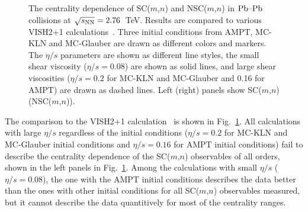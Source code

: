 \begin{figure}[t!]
	\begin{center}
        \caption{The centrality dependence of SC($m$,$n$) and NSC($m$,$n$) in $\textnormal{Pb--Pb}$ collisions at $\sqrt{s_{\textnormal{NN}}}=2.76$~TeV. Results are compared to various VISH2+1 calculations~\cite{Zhu:2016puf}. Three initial conditions from AMPT, MC-KLN and MC-Glauber are drawn as different colors and markers. The $\eta/s$ parameters are shown as different line styles, the small shear viscosity ($\eta/s=0.08$) are shown as solid lines, and large shear viscosities ($\eta/s=0.2$ for MC-KLN and MC-Glauber and 0.16 for AMPT) are drawn as dashed lines. Left (right) panels show SC($m$,$n$)  (NSC($m$,$n$)).}
        \label{fig:Figure_5}
        \end{center}   
 \end{figure}
 
The comparison to the VISH2+1 calculation~\cite{Zhu:2016puf} is shown in Fig.~\ref{fig:Figure_5}.  All calculations with large $\eta/s$ regardless of the initial conditions ($\eta/s=0.2$ for MC-KLN and MC-Glauber initial conditions and $\eta/s=0.16$ for AMPT initial conditions) fail to describe the centrality dependence of the SC($m$,$n$) observables of all orders, shown in the left panels in Fig.~\ref{fig:Figure_5}.
Among the calculations with small $\eta/s$ ($\eta/s=0.08$), the one with the AMPT initial conditions describes the data better than the ones with other initial conditions for all SC($m$,$n$) observables measured, but it cannot describe the data quantitively for most of the centrality ranges.

